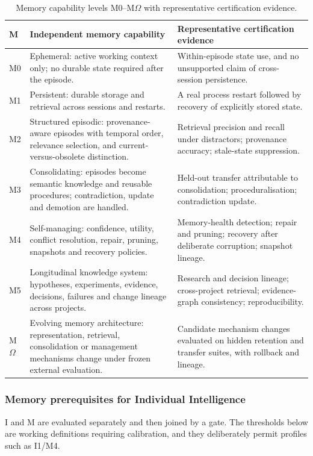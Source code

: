 \documentclass[11pt]{article}
\theoremstyle{definition}
\newcommand{\Om}{\ensuremath{\Omega}}
\begin{document}
\begin{table}[H]
\centering\small
\begin{tabularx}{\textwidth}{@{}lYZ@{}}
\toprule
M & Independent memory capability & Representative certification evidence \\
\midrule
M0 & Ephemeral: active working context only; no durable state required after the episode. & Within-episode state use, and no unsupported claim of cross-session persistence. \\
M1 & Persistent: durable storage and retrieval across sessions and restarts. & A real process restart followed by recovery of explicitly stored state. \\
M2 & Structured episodic: provenance-aware episodes with temporal order, relevance selection, and current-versus-obsolete distinction. & Retrieval precision and recall under distractors; provenance accuracy; stale-state suppression. \\
M3 & Consolidating: episodes become semantic knowledge and reusable procedures; contradiction, update and demotion are handled. & Held-out transfer attributable to consolidation; proceduralisation; contradiction update. \\
M4 & Self-managing: confidence, utility, conflict resolution, repair, pruning, snapshots and recovery policies. & Memory-health detection; repair and pruning; recovery after deliberate corruption; snapshot lineage. \\
M5 & Longitudinal knowledge system: hypotheses, experiments, evidence, decisions, failures and change lineage across projects. & Research and decision lineage; cross-project retrieval; evidence-graph consistency; reproducibility. \\
M\Om{} & Evolving memory architecture: representation, retrieval, consolidation or management mechanisms change under frozen external evaluation. & Candidate mechanism changes evaluated on hidden retention and transfer suites, with rollback and lineage. \\
\bottomrule
\end{tabularx}
\caption{Memory capability levels M0--M\Om{} with representative certification evidence.}
\label{tab:m}
\end{table}

\subsubsection{Memory prerequisites for Individual Intelligence}

I and M are evaluated separately and then joined by a gate. The thresholds below are working definitions requiring calibration, and they deliberately permit profiles such as I1/M4.
\end{document}
